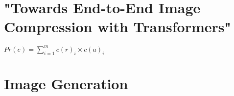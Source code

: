 


\newpage
\section{"Towards End-to-End Image Compression with Transformers"}




\begin{center}
$Pr(e) = \displaystyle\sum_{i=1}^{m} c(r)_i \times c(a)_i $
\end{center}

\section{Image Generation}

